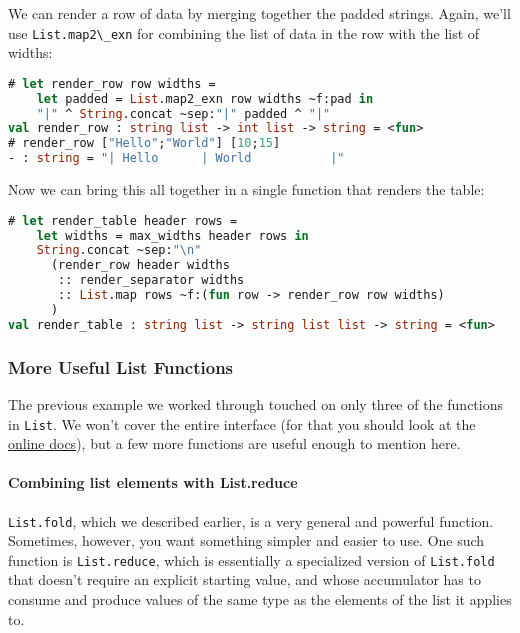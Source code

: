 We can render a row of data by merging together the padded strings.
Again, we'll use \passthrough{\lstinline!List.map2\_exn!} for combining
the list of data in the row with the list of widths:

\begin{lstlisting}[language=Caml]
# let render_row row widths =
    let padded = List.map2_exn row widths ~f:pad in
    "|" ^ String.concat ~sep:"|" padded ^ "|"
val render_row : string list -> int list -> string = <fun>
# render_row ["Hello";"World"] [10;15]
- : string = "| Hello      | World           |"
\end{lstlisting}

Now we can bring this all together in a single function that renders the
table:

\begin{lstlisting}[language=Caml]
# let render_table header rows =
    let widths = max_widths header rows in
    String.concat ~sep:"\n"
      (render_row header widths
       :: render_separator widths
       :: List.map rows ~f:(fun row -> render_row row widths)
      )
val render_table : string list -> string list list -> string = <fun>
\end{lstlisting}

\hypertarget{more-useful-list-functions}{%
\subsubsection{More Useful List
Functions}\label{more-useful-list-functions}}

The previous example we worked through touched on only three of the
functions in \passthrough{\lstinline!List!}. We won't cover the entire
interface (for that you should look at the
\href{http://realworldocaml.org/doc}{online docs}), but a few more
functions are useful enough to mention here.

\hypertarget{combining-list-elements-with-list.reduce}{%
\paragraph{Combining list elements with
List.reduce}\label{combining-list-elements-with-list.reduce}}

\passthrough{\lstinline!List.fold!}, which we described earlier, is a
very general and powerful function. Sometimes, however, you want
something simpler and easier to use. One such function is
\passthrough{\lstinline!List.reduce!}, which is essentially a
specialized version of \passthrough{\lstinline!List.fold!} that doesn't
require an explicit starting value, and whose accumulator has to consume
and produce values of the same type as the elements of the list it
applies to.

